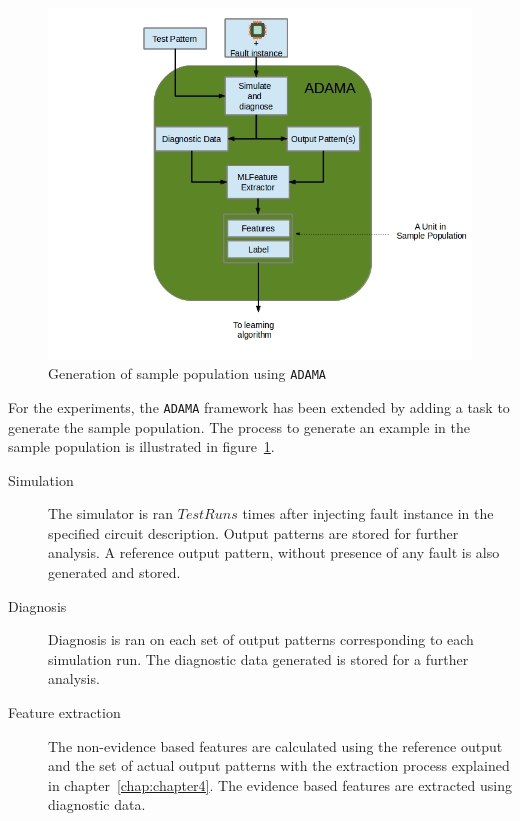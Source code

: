 \begin{figure}[h]
  \begin{center}
    \captionsetup{justification=centering}
    \includegraphics[scale=0.45]{figures/sampopl.png}
    \caption{Generation of sample population using \texttt{ADAMA}}
    \label{fig:sampopl}
  \end{center}
\end{figure}

For the experiments, the \texttt{ADAMA} framework has been extended by adding a task to generate the sample population. The process to generate an example in the sample population is illustrated in figure~\ref{fig:sampopl}.

\begin{description}
  \item[Simulation] The simulator is ran $TestRuns$ times after injecting fault instance in the specified circuit description. Output patterns are stored for further analysis. A reference output pattern, without presence of any fault is also generated and stored. 

  \item[Diagnosis] Diagnosis is ran on each set of output patterns corresponding to each simulation run. The diagnostic data generated is stored for a further analysis. 

  \item[Feature extraction] The non-evidence based features are calculated using the reference output and the set of actual output patterns with the extraction process explained in chapter~\ref{chap:chapter4}. The evidence based features are extracted using diagnostic data.

\end{description}

